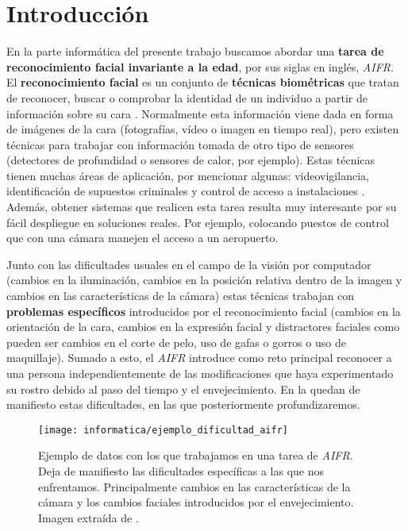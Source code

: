 \chapter{Introducción} \label{ich:introduccion}

En la parte informática del presente trabajo buscamos abordar una \textbf{tarea de reconocimiento facial invariante a la edad}, por sus siglas en inglés, \textit{AIFR}. El \textbf{reconocimiento facial} es un conjunto de \textbf{técnicas biométricas} que tratan de reconocer, buscar o comprobar  la identidad de un individuo a partir de información sobre su cara \cite{informatica:definicion_face_recognition}. Normalmente esta información viene dada en forma de imágenes de la cara (fotografías, vídeo o imagen en tiempo real), pero existen técnicas para trabajar con información tomada de otro tipo de sensores (detectores de profundidad o  sensores de calor, por ejemplo). Estas técnicas tienen muchas áreas de aplicación, por mencionar algunas: videovigilancia, identificación de supuestos criminales y control de acceso a instalaciones \cite{informatica:deep_fr_survey}. Además, obtener sistemas que realicen esta tarea resulta muy interesante por su fácil despliegue en soluciones reales. Por ejemplo, colocando puestos de control que con una cámara manejen el acceso a un aeropuerto.

Junto con las dificultades usuales en el campo de la visión por computador (cambios en la iluminación, cambios en la posición relativa dentro de la imagen y cambios en las características de la cámara) estas técnicas trabajan con \textbf{problemas específicos} introducidos por el reconocimiento facial (cambios en la orientación de la cara, cambios en la expresión facial y distractores faciales como pueden ser cambios en el corte de pelo, uso de gafas o gorros o uso de maquillaje). Sumado a esto, el \textit{AIFR} introduce como reto principal reconocer a una persona independientemente de las modificaciones que haya experimentado su rostro debido al paso del tiempo y el envejecimiento. En la  quedan de manifiesto estas dificultades, en las que posteriormente profundizaremos.

\begin{figure}[h]
	\centering
	\texttt{[image: informatica/ejemplo\_dificultad\_aifr]}
	\caption{Ejemplo de datos con los que trabajamos en una tarea de \textit{AIFR}. Deja de manifiesto las dificultades específicas a las que nos enfrentamos. Principalmente cambios en las características de la cámara y los cambios faciales introducidos por el envejecimiento. Imagen extraída de \cite{informatica:aifr_survey}.}
	\label{img:ejemplo_dificultad_aifr}
\end{figure}

